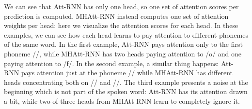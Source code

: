 We can see that Att-RNN has only one head, so one set of attention scores per prediction is computed. MHAtt-RNN instead computes one set of attention weights per head: here we visualize the attention scores for each head. In these examples, we can see how each head learns to pay attention to different phonemes of the same word. In the first example, Att-RNN pays attention only to the first phoneme //, while MHAtt-RNN has two heads paying attention to /o/ and one paying attention to /f/. In the second example, a similar thing happens: Att-RNN pays attention just at the phoneme // while MHAtt-RNN has different heads concentrating both on // and //. The third example presents a noise at the beginning which is not part of the spoken word: Att-RNN has its attention drawn a bit, while two of three heads from MHAtt-RNN learn to completely ignore it.


